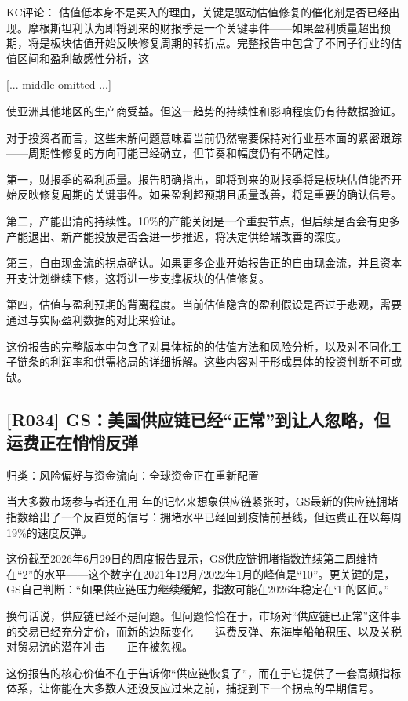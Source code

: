 \documentclass[11pt]{ctexart}
\begin{document}
KC评论： 估值低本身不是买入的理由，关键是驱动估值修复的催化剂是否已经出现。摩根斯坦利认为即将到来的财报季是一个关键事件——如果盈利质量超出预期，将是板块估值开始反映修复周期的转折点。完整报告中包含了不同子行业的估值区间和盈利敏感性分析，这

[... middle omitted ...]

使亚洲其他地区的生产商受益。但这一趋势的持续性和影响程度仍有待数据验证。

对于投资者而言，这些未解问题意味着当前仍然需要保持对行业基本面的紧密跟踪——周期性修复的方向可能已经确立，但节奏和幅度仍有不确定性。

第一，财报季的盈利质量。报告明确指出，即将到来的财报季将是板块估值能否开始反映修复周期的关键事件。如果盈利超预期且质量改善，将是重要的确认信号。

第二，产能出清的持续性。10\%的产能关闭是一个重要节点，但后续是否会有更多产能退出、新产能投放是否会进一步推迟，将决定供给端改善的深度。

第三，自由现金流的拐点确认。如果更多企业开始报告正的自由现金流，并且资本开支计划继续下修，这将进一步支撑板块的估值修复。

第四，估值与盈利预期的背离程度。当前估值隐含的盈利假设是否过于悲观，需要通过与实际盈利数据的对比来验证。

这份报告的完整版本中包含了对具体标的的估值方法和风险分析，以及对不同化工子链条的利润率和供需格局的详细拆解。这些内容对于形成具体的投资判断不可或缺。

\subsection{[R034] GS：美国供应链已经“正常”到让人忽略，但运费正在悄悄反弹}
{\small\color{refgray}归类：风险偏好与资金流向：全球资金正在重新配置}

当大多数市场参与者还在用 年的记忆来想象供应链紧张时，GS最新的供应链拥堵指数给出了一个反直觉的信号：拥堵水平已经回到疫情前基线，但运费正在以每周19\%的速度反弹。

这份截至2026年6月29日的周度报告显示，GS供应链拥堵指数连续第二周维持在“2”的水平——这个数字在2021年12月/2022年1月的峰值是“10”。更关键的是，GS自己判断：“如果供应链压力继续缓解，指数可能在2026年稳定在‘1’的区间。”

换句话说，供应链已经不是问题。但问题恰恰在于，市场对“供应链已正常”这件事的交易已经充分定价，而新的边际变化——运费反弹、东海岸船舶积压、以及关税对贸易流的潜在冲击——正在被忽视。

这份报告的核心价值不在于告诉你“供应链恢复了”，而在于它提供了一套高频指标体系，让你能在大多数人还没反应过来之前，捕捉到下一个拐点的早期信号。
\end{document}
